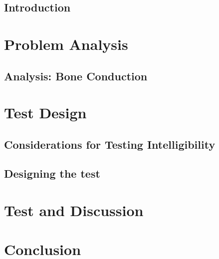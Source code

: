 \glsresetall
 \graphicspath{{figures/analysing/}}
\chapter{Introduction}\label{ch:intro}



\part{Problem Analysis}\label{pt:analysis} \glsresetall
\graphicspath{{figures/analysis/}}
\chapter{Analysis: Bone Conduction}\label{ch:bone_conductors}







\part{Test Design}\label{pt:design} 
\graphicspath{{figures/design/}}	
\chapter{Considerations for Testing Intelligibility}\label{ch:test_considerations}





\chapter{Designing the test}\label{ch:test_design}




\part{Test and Discussion}\label{pt:test}
\graphicspath{{figures/tests/}}




 
\part{Conclusion}\label{pt:conclusion}



